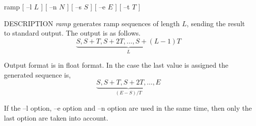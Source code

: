 % 
% 
% 
% 
%                                                                        
%
\hypertarget{ramp}{}

\begin{synopsis}
\item[ramp] [ --l $L$ ] [ --n $N$ ] [ --s $S$ ] [ --e $E$ ] [ --t $T$ ]
\end{synopsis}

\begin{qsection}{DESCRIPTION}
{\em ramp} generates ramp sequences of length $L$, 
sending the result to standard output. 
The output is as follows.
\begin{displaymath}
\underbrace{S, S+T, S+2T,  \dots, S+(L-1)T}_{L}
\end{displaymath}
\par
Output format is in float format.
In the case the last value is assigned 
the generated sequence is,
\begin{displaymath}
\underbrace{S, S+T, S+2T,  \dots, E}_{(E-S)/T}
\end{displaymath}
\par
If the --l option, --e option and --n option are used
in the same time, then only the last option are taken into account.
\end{qsection}

